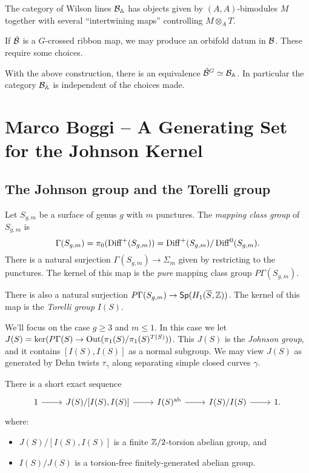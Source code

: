 \documentclass{amsart}
\begin{document}
The category of Wilson lines $\mathcal{B}_{\mathbb{A}}$ has objects given by $(A, A)$-bimodules $M$ together with several ``intertwining maps'' controlling $M \otimes_A T$.

If $\hat{\mathcal{B}}$ is a $G$-crossed ribbon map, we may produce an orbifold datum in $\mathcal{B}$.
These require some choices.

\begin{thm}
  With the above construction, there is an equivalence $\hat{\mathcal{B}}^G \simeq \mathcal{B}_{\mathbb{A}}$.
  In particular the category $\mathcal{B}_{\mathbb{A}}$ is independent of the choices made.
\end{thm}

\section{Marco Boggi -- A Generating Set for the Johnson Kernel}

\subsection{The Johnson group and the Torelli group}

Let $S_{g,m}$ be a surface of genus $g$ with $m$ punctures.
The \emph{mapping class group} of $S_{g,m}$ is
\[
  \Gamma(S_{g,m}) = \pi_0(\operatorname{Diff}^+(S_{g,m})) = \operatorname{Diff}^+(S_{g,m}) / \operatorname{Diff}^0(S_{g,m}).
\]
There is a natural surjection $\Gamma(S_{g,m}) \to \Sigma_m$ given by restricting to the punctures.
The kernel of this map is the \emph{pure} mapping class group $P\Gamma(S_{g,m})$.

There is also a natural surjection $P\Gamma(S_{g,m}) \to \mathsf{Sp}(H_1(\overline{S}, \mathbb{Z}))$.
The kernel of this map is the \emph{Torelli group} $I(S)$.

We'll focus on the case $g \geq 3$ and $m \leq 1$.
In this case we let $J(S) = \ker(P\Gamma(S) \to \operatorname{Out}(\pi_1(S) / \pi_1(S)^{T(S)}))$.
This $J(S)$ is the \emph{Johnson group}, and it contains $[I(S), I(S)]$ as a normal subgroup.
We may view $J(S)$ as generated by Dehn twists $\tau_\gamma$ along separating simple closed curves $\gamma$.

There is a short exact sequence
\[
  \begin{tikzcd}
    1 \rar & J(S) / [I(S), I(S)] \rar & I(S)^\ab \rar & I(S) / I(S) \rar & 1.
  \end{tikzcd}
\]
where:
\begin{itemize}
  \item $J(S) / [I(S), I(S)]$ is a finite $\mathbb{Z}/2$-torsion abelian group, and
  \item $I(S) / J(S)$ is a torsion-free finitely-generated abelian group.
\end{itemize}
\end{document}
